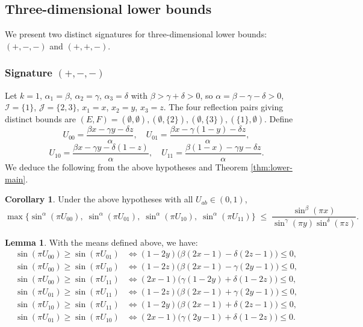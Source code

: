 \documentclass[12pt]{amsart}
\theoremstyle{definition}
\newtheorem{lemma}{Lemma}[section]
\newtheorem{corollary}{Corollary}[section]
\begin{document}
\subsection{Three-dimensional lower bounds}

We present two distinct signatures for three-dimensional lower bounds: $(+,-,-)$ and $(+,+,-)$.

\subsubsection{Signature $(+,-,-)$}

Let $k=1$, $\alpha_1=\beta$, $\alpha_2=\gamma$, $\alpha_3=\delta$ with $\beta > \gamma + \delta > 0$, so $\alpha = \beta - \gamma - \delta > 0$, $\mathcal I=\{1\}$, $\mathcal J=\{2,3\}$, $x_1=x$, $x_2=y$, $x_3=z$. The four reflection pairs giving distinct bounds are $(E,F)=(\emptyset,\emptyset),(\emptyset,\{2\}),(\emptyset,\{3\}),(\{1\},\emptyset)$. Define
\[
U_{00} = \frac{\beta x - \gamma y - \delta z}{\alpha},\quad
U_{01} = \frac{\beta x - \gamma(1-y) - \delta z}{\alpha},
\]
\[
U_{10} = \frac{\beta x - \gamma y - \delta(1-z)}{\alpha},\quad
U_{11} = \frac{\beta (1-x) - \gamma y - \delta z}{\alpha}.
\]
We deduce the following from the above hypotheses and Theorem \ref{thm:lower-main}.
\begin{corollary}\label{cor:3d-lower-mminus}
Under the above hypotheses with all $U_{ab} \in (0,1)$,
\[
\max\bigl\{
  \sin^{\alpha}(\pi U_{00}),\;
  \sin^{\alpha}(\pi U_{01}),\;
  \sin^{\alpha}(\pi U_{10}),\;
  \sin^{\alpha}(\pi U_{11})
\bigr\}
\;\leq\; \frac{\sin^\beta(\pi x)}{\sin^\gamma(\pi y)\sin^\delta(\pi z)}.
\]
\end{corollary}

\begin{lemma}\label{lem:3d-lower-mminus-compare}
With the means defined above, we have:
\begin{align}
\sin(\pi U_{00}) \ge \sin(\pi U_{01}) &\iff (1-2y)\bigl(\beta(2x-1) - \delta(2z-1)\bigr) \le 0, \tag{i}\\
\sin(\pi U_{00}) \ge \sin(\pi U_{10}) &\iff (1-2z)\bigl(\beta(2x-1) - \gamma(2y-1)\bigr) \le 0, \tag{ii}\\
\sin(\pi U_{00}) \ge \sin(\pi U_{11}) &\iff (2x-1)\bigl(\gamma(1-2y) + \delta(1-2z)\bigr) \le 0, \tag{iii}\\
\sin(\pi U_{01}) \ge \sin(\pi U_{11}) &\iff (1-2z)\bigl(\beta(2x-1) + \gamma(2y-1)\bigr) \le 0, \tag{iv}\\
\sin(\pi U_{10}) \ge \sin(\pi U_{11}) &\iff (1-2y)\bigl(\beta(2x-1) + \delta(2z-1)\bigr) \le 0, \tag{v}\\
\sin(\pi U_{01}) \ge \sin(\pi U_{10}) &\iff (2x-1)\bigl(\gamma(2y-1) + \delta(1-2z)\bigr) \le 0. \tag{vi}
\end{align}
\end{lemma}
\end{document}
